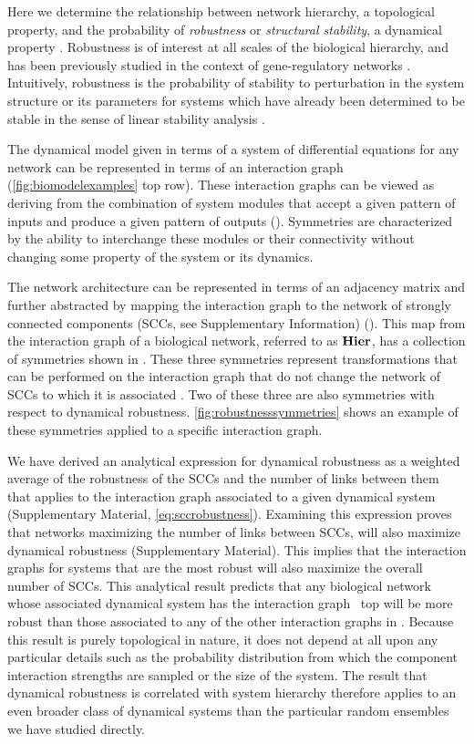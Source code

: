 Here we determine the relationship between network hierarchy, a topological property, and the probability of \emph{robustness} or \emph{structural stability}, a dynamical property \cite{Smale1967}. Robustness is of interest at all scales of the biological hierarchy, and has been previously studied in the context of gene-regulatory networks \cite{WADDINGTON1942a,VanNimwegen1999,Siegal2002,Ciliberti2007b,Ciliberti2007,Wagner2013}. Intuitively, robustness is the probability of stability to perturbation in the system structure or its parameters for systems which have already been determined to be stable in the sense of linear stability analysis \cite{Davis1962}.

The dynamical model given in terms of a system of differential equations for any network can be represented in terms of an interaction graph (\ref{fig:biomodelexamples} top row). These interaction graphs can be viewed as deriving from the combination of system modules that accept a given pattern of inputs and produce a given pattern of outputs (). Symmetries are characterized by the ability to interchange these modules or their connectivity without changing some property of the system or its dynamics.

The network architecture can be represented in terms of an adjacency matrix and further abstracted by mapping the interaction graph to the network of strongly connected components (SCCs, see Supplementary Information) (). This map from the interaction graph of a biological network, referred to as $\mathbf{Hier}$, has a collection of symmetries shown in . These three symmetries represent transformations that can be performed on the interaction graph that do not change the network of SCCs to which it is associated . Two of these three are also symmetries with respect to dynamical robustness. \ref{fig:robustnesssymmetries} shows an example of these symmetries applied to a specific interaction graph.

We have derived an analytical expression for dynamical robustness as a weighted average of the robustness of the SCCs and the number of links between them that applies to the interaction graph associated to a given dynamical system (Supplementary Material, \ref{eq:sccrobustness}). Examining this expression proves that networks maximizing the number of links between SCCs, will also maximize dynamical robustness (Supplementary Material). This implies that the interaction graphs for systems that are the most robust will also maximize the overall number of SCCs. This analytical result predicts that any biological network whose associated dynamical system has the interaction graph  $\,$ top will be more robust than those associated to any of the other interaction graphs in . Because this result is purely topological in nature, it does not depend at all upon any particular details such as the probability distribution from which the component interaction strengths are sampled or the size of the system. The result that dynamical robustness is correlated with system hierarchy therefore applies to an even broader class of dynamical systems than the particular random ensembles we have studied directly.

